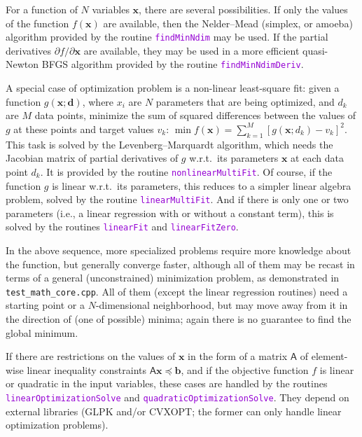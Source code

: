 \documentclass[12pt]{article}
\newcommand{\ttt}[1]{\textcolor{darkviolet}{\texttt{#1}}}
\newcommand{\D}{\partial}
\newcommand{\bx}{\boldsymbol{x}}
\begin{document}
For a function of $N$ variables $\bx$, there are several possibilities. If only the values of the function $f(\bx)$ are available, then the Nelder--Mead (simplex, or amoeba) algorithm provided by the routine \ttt{findMinNdim} may be used. 
If the partial derivatives $\D f/\D \bx$ are available, they may be used in a more efficient quasi-Newton BFGS algorithm provided by the routine \ttt{findMinNdimDeriv}.

A special case of optimization problem is a non-linear least-square fit: given a function $g(\bx; \boldsymbol{d})$, where $x_i$ are $N$ parameters that are being optimized, and $d_k$ are $M$ data points, minimize the sum of squared differences between the values of $g$ at these points and target values $v_k$: $\min f(\bx) = \sum_{k=1}^M [g(\bx; d_k) - v_k]^2$. This task is solved by the Levenberg--Marquardt algorithm, which needs the Jacobian matrix of partial derivatives of $g$ w.r.t.\ its parameters $\boldsymbol x$ at each data point $d_k$. It is provided by the routine \ttt{nonlinearMultiFit}.
Of course, if the function $g$ is linear w.r.t.\ its parameters, this reduces to a simpler linear algebra problem, solved by the routine \ttt{linearMultiFit}. And if there is only one or two parameters (i.e., a linear regression with or without a constant term), this is solved by the routines \ttt{linearFit} and \ttt{linearFitZero}.

In the above sequence, more specialized problems require more knowledge about the function, but generally converge faster, although all of them may be recast in terms of a general (unconstrained) minimization problem, as demonstrated in \texttt{test_math_core.cpp}.
All of them (except the linear regression routines) need a starting point or a $N$-dimensional neighborhood, but may move away from it in the direction of (one of possible) minima; again there is no guarantee to find the global minimum.

If there are restrictions on the values of $\bx$ in the form of a matrix $\mathsf{A}$ of element-wise linear inequality constraints $\mathsf{A}\bx \preccurlyeq \boldsymbol{b}$, and if the objective function $f$ is linear or quadratic in the input variables, these cases are handled by the routines \ttt{linearOptimizationSolve} and \ttt{quadraticOptimizationSolve}. They depend on external libraries (GLPK and/or CVXOPT; the former can only handle linear optimization problems). 
\end{document}
